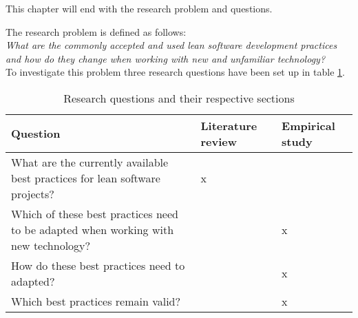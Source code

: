 This chapter will end with the research problem and questions.

The research problem is defined as follows:\\

\textit{What are the commonly accepted and used lean software development practices and how do they change when working with new and unfamiliar technology?}\\

To investigate this problem three research questions have been set up in table \ref{tbl:questions}.


\begin{table}
  \begin{tabular}{p{200pt} | p{70pt} | p{70pt}}
    Question & Literature review & Empirical study \\
    \hline
    What are the currently available best practices for lean software projects? & x & \\
    Which of these best practices need to be adapted when working with new technology? &  & x \\
    How do these best practices need to adapted? &  & x \\
    Which best practices remain valid? &  & x \\
  \end{tabular}
  \caption{Research questions and their respective sections}
  \label{tbl:questions}
\end{table}